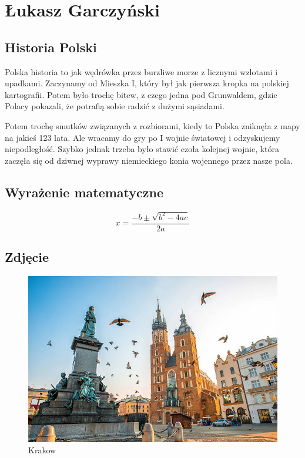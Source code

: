 \section{Łukasz Garczyński}
\label{sec::garczynskil}

\subsection{Historia Polski}

\hspace{1cm} Polska historia to jak wędrówka przez burzliwe morze z licznymi wzlotami i upadkami. Zaczynamy od Mieszka I, który był jak pierwsza kropka na polskiej kartografii. Potem było trochę bitew, z czego jedna pod Grunwaldem, gdzie Polacy pokazali, że potrafią sobie radzić z dużymi sąsiadami.

\hspace{1cm} Potem trochę smutków związanych z rozbiorami, kiedy to Polska zniknęła z mapy na jakieś 123 lata. Ale wracamy do gry po I wojnie światowej i odzyskujemy niepodległość. Szybko jednak trzeba było stawić czoła kolejnej wojnie, która zaczęła się od dziwnej wyprawy niemieckiego konia wojennego przez nasze pola.

\subsection{Wyrażenie matematyczne}
\begin{equation}
     x = \frac{-b \pm \sqrt{b^2 - 4ac}}{2a}
\end{equation}

\subsection{Zdjęcie}

\vspace{0,5cm}
\begin{figure}[htbp]
\centering
\includegraphics[scale=0.8]{pictures/krakow.jpeg}
\vspace{0,5cm}
\caption{Krakow}
\label{fig:krakow}
\end{figure}

